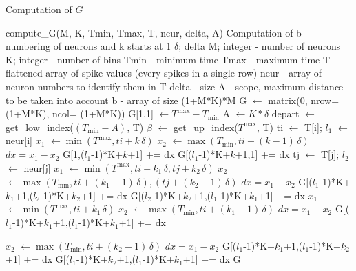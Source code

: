 \documentclass{article}
\def\Tmin{T_{\min}}
\def\Tmax{T^{\max}}
\begin{document}
\clearpage
\begin{algorithm}[!h]
\caption{Computation of $G$}
\begin{algorithmic}[1] 
\Use compute\_G(M, K, Tmin, Tmax, T, neur, delta, A)
  \Desc Computation of b - numbering of neurons and k starts at 1
\Input $\delta$; delta 
  \Input M; integer - number of neurons
  \Input K; integer - number of bins
\Input Tmin - minimum time
\Input Tmax - maximum time
\Input T - flattened array of spike values (every spikes in a single row)
\Input neur - array of neuron numbers to identify them in T
\Input delta - size
\Input A - scope, maximum distance to be taken into account
\Output b - array of size (1+M*K)*M%
\State G $\gets$ matrix(0, nrow=(1+M*K), ncol= (1+M*K)) 
\State G[1,1] $\gets \Tmax - \Tmin$
\State A $\gets K*\delta$ 
\State depart $\gets$ get\_low\_index($(\Tmin-A)$, T)
\State $\beta$ $\gets$ get\_up\_index($\Tmax$, T)
\State ti $\gets$ T[i]; $l_1$ $\gets$ neur[i]
 
\State $x_1$ $\gets \min{(\Tmax, ti+k\,\delta)}$
\State $x_2$ $\gets \max{(\Tmin, ti+(k-1)\,\delta)}$
\State $dx = x_1 - x_2$
\State G[1,($l_1$-1)*K+$k$+1] += dx
\State G[($l_1$-1)*K+$k$+1,1] += dx
\EndIf
\EndFor
{} 
\State tj $\gets$ T[j]; $l_2$ $\gets$ neur[j]
\State $x_1$ $\gets \min{(\Tmax, ti+k_1\,\delta, tj+k_2\,\delta)}$
\State $x_2$ $\gets \max{(\Tmin, ti+(k_1-1)\,\delta), (tj+(k_2-1)\,\delta)}$
\State $dx = x_1 - x_2$
\State G[($l_1$-1)*K+$k_1$+1,($l_2$-1)*K+$k_2$+1] += dx
\State G[($l_2$-1)*K+$k_2$+1,($l_1$-1)*K+$k_1$+1] += dx
\EndIf
\EndFor
\EndFor
\EndFor
{} 
\State $x_1$ $\gets \min{(\Tmax, ti+k_1\,\delta)}$
\State $x_2$ $\gets \max{(\Tmin, ti+(k_1-1)\,\delta)}$
\State $dx = x_1 - x_2$
 
\State G[($l_1$-1)*K+$k_1$+1,($l_1$-1)*K+$k_1$+1] += dx
\EndIf
{}
\end{algorithmic}
\end{algorithm}
\begin{algorithm}[!h]
\begin{algorithmic}[1] 
 
\State $x_2$ $\gets \max{(\Tmin, ti+(k_2-1)\,\delta)}$
\State $dx = x_1 - x_2$
\State G[($l_1$-1)*K+$k_1$+1,($l_1$-1)*K+$k_2$+1] += dx
\State G[($l_1$-1)*K+$k_2$+1,($l_1$-1)*K+$k_1$+1] += dx
\EndIf
\EndFor
\EndFor
\EndFor
\State \Return G
\end{algorithmic}
\end{algorithm}
\end{document}
